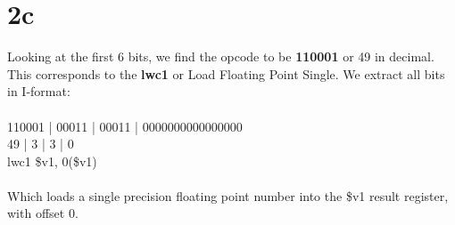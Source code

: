 \documentclass[10pt,a4paper]{article}
\begin{document}
	\section*{2c}
 Looking at the first 6 bits, we find the opcode to be \textbf{110001} or 49 in decimal. This corresponds to the \textbf{lwc1} or Load Floating Point Single. We extract all bits in I-format: \\\\
	110001 | 00011 | 00011 | 0000000000000000 \\
	49 | 3 | 3 | 0 \\
	lwc1 \$v1, 0(\$v1) \\\\
	Which loads a single precision floating point number into the \$v1 result register, with offset 0.  
	
	
\end{document}
